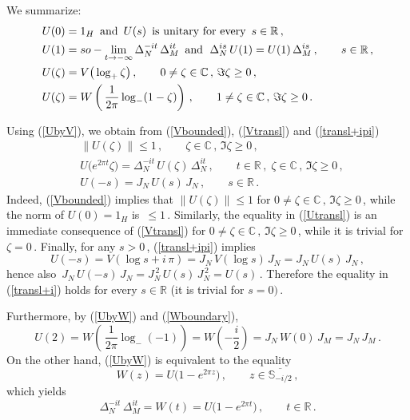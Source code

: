 \documentclass[reqno]{amsart}
\theoremstyle{definition}
\theoremstyle{remark}
\numberwithin{equation}{section}
\theoremstyle{plain}
\begin{document}
We summarize:
\begin{align}
&U(0)=1_H\,\text{ and }\, U(s)\,\text{ is unitary for every }\,
s\in\mathbb R\, , \notag \\
&U(1)=so-\lim_{t\to -\infty}\Delta_N^{-it}\,\Delta_M^{it}\,
\text{ and }\;\Delta_N^{is}\, U(1)=U(1)\,\Delta_M^{is}\, ,\qquad
s\in\mathbb R\,  , \label{wave} \\
&U(\zeta ) =V\big( \log_+ \zeta \big)\, ,\qquad 0\neq \zeta \in
\mathbb C\, ,\, \Im \zeta\geq 0\, , \label{UbyV} \\
&U(\zeta ) =W\left(\, \frac 1{2 \pi} \log_- (1-\zeta )\right)\, ,
\qquad 1\neq \zeta\in\mathbb C\, ,\, \Im \zeta\geq 0\, .
\label{UbyW}
\end{align}

Using (\ref{UbyV}), we obtain from (\ref{Vbounded}),
(\ref{Vtransl}) and (\ref{transl+ipi})
\begin{align}
&\| U(\zeta )\|\leq 1\, ,\qquad \zeta\in\mathbb C\, ,\, \Im \zeta
\geq 0\, , \label{Ubounded} \\
&U\big( e^{2 \pi t} \zeta\big) =\Delta_N^{-it}\, U(\zeta )\,
\Delta_N^{it}\, ,\qquad t\in\mathbb R\, ,\;\zeta\in\mathbb C\, ,\,
\Im \zeta\geq 0\, , \label{Utransl} \\
&U(-s)=J_N\, U(s)\, J_N\, ,\qquad s\in\mathbb R\, .
\label{transl+i}
\end{align}
Indeed, (\ref{Vbounded}) implies that $\| U(\zeta )\|\leq 1$ for
$0\neq \zeta\in\mathbb C\, ,\, \Im \zeta\geq 0\,$, while the norm
of $U(0)=1_H$ is $\,\leq1\,$. Similarly, the equality in
(\ref{Utransl}) is an immediate consequence of (\ref{Vtransl}) for
$0\neq \zeta\in \mathbb C\, ,\, \Im \zeta\geq 0\,$, while it is
trivial for $\zeta =0\,$. Finally, for any $s>0\,$, (\ref{transl+ipi})
implies
\begin{equation*}
U(-s)= V( \log s +i\,\pi )= J_N\, V( \log s)\, J_N =J_N\, U(s)\,
J_N\, ,
\end{equation*}
hence also $\, J_N\, U(-s)\, J_N =J_N^{\, 2}\, U(s)\, J_N^{\, 2}
=U(s)\,$. Therefore the equality in (\ref{transl+i}) holds for
every $s\in\mathbb R$ (it is trivial for $s=0)\,$.

Furthermore, by (\ref{UbyW}) and (\ref{Wboundary}),
\begin{equation}\label{2}
U(2)=W\left(\, \frac 1{2 \pi} \log_- (-1)\right) =
W\left( -\frac i2 \right) =J_N\, W(0)\, J_M =J_N\, J_M\, .
\end{equation}
On the other hand, (\ref{UbyW}) is equivalent to the equality
\begin{equation*}
W(z)=U\big( 1-e^{2 \pi z}\big)\, ,\qquad z\in
\overline{\mathbb S_{-i/2}}\, ,
\end{equation*}
which yields
\begin{equation}\label{WbyU}
\Delta_N^{-it}\,\Delta_M^{it} =W(t) =U\big( 1-e^{2 \pi t}\big)\, ,
\qquad t\in\mathbb R\, .
\end{equation}
\smallskip
\end{document}
